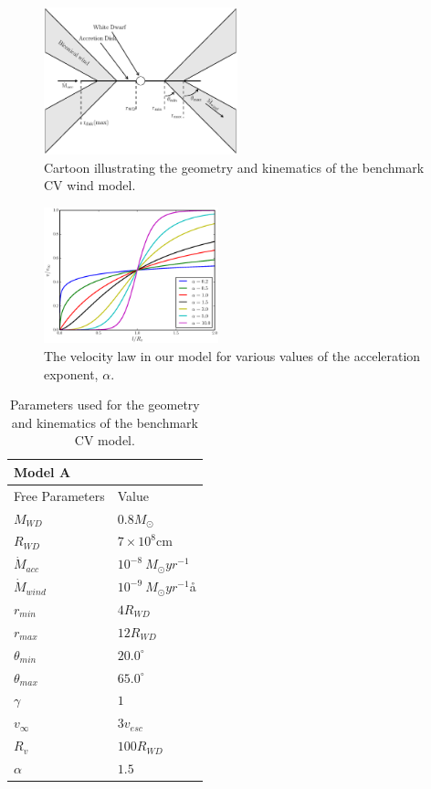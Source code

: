 \documentclass[preprint, a4paper, 11pt]{aastex}
\begin{document}
\begin{figure}
\centering
\includegraphics[width=0.5\textwidth]{figures/fig2_cartoon.eps}
\caption{Cartoon illustrating the geometry and kinematics of the benchmark CV wind model.}
\label{cartoon}
\end{figure}


\begin{figure}
\centering
\includegraphics[width=0.45\textwidth]{figures/acc_law.eps}
\caption{
The velocity law in our model for various values of
the acceleration exponent, $\alpha$.
}
\label{acc_law}
\end{figure}


\begin{table}
\centering
\begin{tabular}{p{3cm}p{4cm}}
Model A \\
\hline Free Parameters 	&	 Value \\ 
\hline \hline 
$M_{WD}$ 	 &	 $0.8 M_{\odot}$ \\ 
$R_{WD}$ 	 &	 $7\times10^{8}$cm\\ 
$\dot{M}_{acc}$ 	 &	 $10^{-8}~M_{\odot}yr^{-1}$\\ 
$\dot{M}_{wind}$  &	$10^{-9}~M_{\odot}yr^{-1}$å\\ 
$r_{min}$ 	&	 $4 R_{WD}$\\ 
$r_{max}$ 	&	 $12 R_{WD}$ \\ 
$\theta_{min}$ 	&	 $20.0^{\circ}$ \\ 
$\theta_{max}$ 	&	 $65.0^{\circ}$ \\ 
$\gamma$ 	&	 $1$ \\ 
$v_{\infty}$ 	&	 $3v_{esc}$ \\ 
$R_v$ 	        &	 $100 R_{WD}$ \\ 
$\alpha$ 	&	 $1.5$ \\
\end{tabular}
\centering
\caption{
Parameters used for the geometry and kinematics of the benchmark CV model.}
\label{wind_param}
\end{table}
\end{document}
